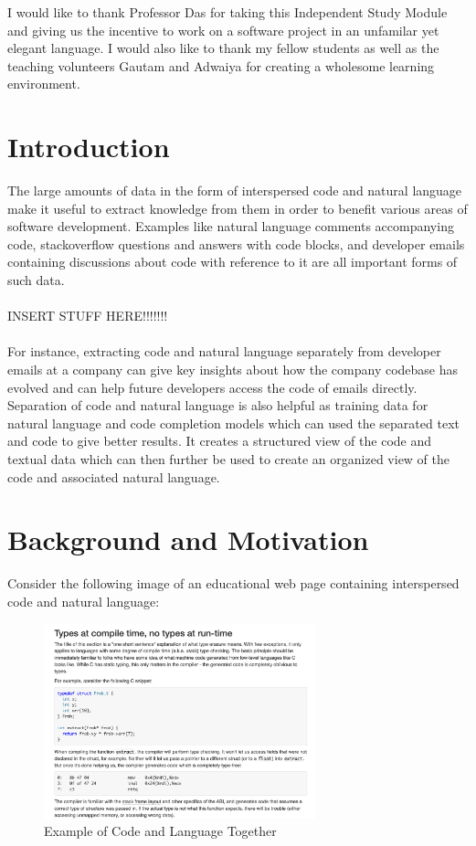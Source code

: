 \documentclass[12pt]{scrreprt}
\begin{document}
I would like to thank Professor Das for taking this Independent Study Module and giving us the incentive to work on a software project in an unfamilar yet elegant language. I would also like to thank my fellow students as well as the teaching volunteers Gautam and Adwaiya for creating a wholesome learning environment. 


\chapter{Introduction}


The large amounts of data in the form of interspersed code and natural language make it useful to extract knowledge from them in order to benefit various areas of software development. Examples like natural language comments accompanying code, stackoverflow questions and answers with code blocks, and developer emails containing discussions about code with reference to it are all important forms of such data. \\ 
\\ INSERT STUFF HERE!!!!!!!\\   
\\ For instance, extracting code and natural language separately from developer emails at a company can give key insights about how the company codebase has evolved and can help future developers access the code of emails directly. Separation of code and natural language is also helpful as training data for natural language and code completion models which can used the separated text and code to give better results. It creates a structured view of the code and textual data which can then further be used to create an organized view of the code and associated natural language. 


\chapter{Background and Motivation}


Consider the following image of an educational web page containing interspersed code and natural language:

\begin{figure}[h]
    \centering
    \includegraphics[width=0.7\textwidth]{figures/background-eg.png}
    \caption{Example of Code and Language Together}
    \label{fig:high-level-arch}
\end{figure}
\end{document}
